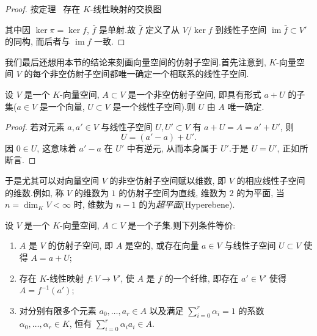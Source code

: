 \begin{proof}
按定理~ 存在 $K$-线性映射的交换图
\begin{center}
\end{center}
其中因 $\ker \pi = \ker f$, $\bar{f}$ 是单射.故 $\bar{f}$ 定义了从 $V/\ker f$ 到线性子空间 $\operatorname{im}\bar{f} \subset V'$ 的同构, 而后者与 $\operatorname{im} f$ 一致.
\end{proof}

我们最后还想用本节的结论来刻画向量空间的仿射子空间.首先注意到, $K$-向量空间 $V$ 的每个非空仿射子空间都唯一确定一个相联系的线性子空间.

\begin{remark}\label{rem:2.2.10}
设 $V$ 是一个 $K$-向量空间, $A \subset V$ 是一个非空仿射子空间, 即具有形式 $a + U$ 的子集($a \in V$ 是一个向量, $U \subset V$ 是一个线性子空间).则 $U$ 由 $A$ 唯一确定.
\end{remark}

\begin{proof}
若对元素 $a, a' \in V$ 与线性子空间 $U, U' \subset V$ 有 $a + U = A = a' + U'$, 则
\[
U = (a' - a) + U'\text{.}
\]
因 $0 \in U$, 这意味着 $a' - a$ 在 $U'$ 中有逆元, 从而本身属于 $U'$.于是 $U = U'$, 正如所断言.
\end{proof}

于是尤其可以对向量空间 $V$ 的非空仿射子空间赋以维数, 即 $V$ 的相应线性子空间的维数.例如, 称 $V$ 的维数为 $1$ 的仿射子空间为直线, 维数为 $2$ 的为平面, 当 $n = \dim_K V < \infty$ 时, 维数为 $n - 1$ 的为\emph{超平面}(\textup{Hyperebene}).

\begin{theorem}[仿射子空间的刻画]\label{thm:2.2.11}
设 $V$ 是一个 $K$-向量空间, $A \subset V$ 是一个子集.则下列条件等价:
\begin{enumerate}
\item[(i)] $A$ 是 $V$ 的仿射子空间, 即 $A$ 是空的, 或存在向量 $a \in V$ 与线性子空间 $U \subset V$ 使得 $A = a + U$;
\item[(ii)] 存在 $K$-线性映射 $f \colon V \longrightarrow V'$, 使 $A$ 是 $f$ 的一个纤维, 即存在 $a' \in V'$ 使得 $A = f^{-1}(a')$;
\item[(iii)] 对分别有限多个元素 $a_0, \ldots, a_r \in A$ 以及满足 $\sum_{i = 0}^{r} \alpha_i = 1$ 的系数 $\alpha_0, \ldots, \alpha_r \in K$, 恒有 $\sum_{i = 0}^{r} \alpha_i a_i \in A$.
\end{enumerate}
\end{theorem}

